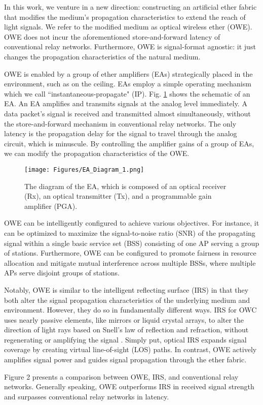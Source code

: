 In this work, we venture in a new direction: constructing an artificial ether fabric that modifies the medium's propagation characteristics to extend the reach of light signals. We refer to the modified medium as optical wireless ether (OWE). OWE does not incur the aforementioned store-and-forward latency of conventional relay networks. Furthermore, OWE is signal-format agnostic: it just changes the propagation characteristics of the natural medium.
\par
OWE is enabled by a group of ether amplifiers (EAs) strategically placed in the environment, such as on the ceiling. EAs employ a simple operating mechanism which we call “instantaneous-propagate" (IP). 
Fig. \ref{EA_Diagram} shows the schematic of an EA. An EA amplifies and transmits signals at the analog level immediately. A data packet's signal is received and transmitted almost simultaneously, without the store-and-forward mechanism in conventional relay networks. The only latency is the propagation delay for the signal to travel through the analog circuit, which is minuscule. By controlling the amplifier gains of a group of EAs, we can modify the propagation characteristics of the OWE.
\begin{figure}
\centering
\texttt{[image: Figures/EA\_Diagram\_1.png]}
\caption{The diagram of the EA, which is composed of an optical receiver (Rx), an optical transmitter (Tx), and a programmable gain amplifier (PGA).}
\label{EA_Diagram}
\vspace{-0.2cm}
\end{figure}
\par
OWE can be intelligently configured to achieve various objectives. For instance, it can be optimized to maximize the signal-to-noise ratio (SNR) of the propagating signal within a single basic service set (BSS) \cite{gast2005802} consisting of one AP serving a group of stations. Furthermore, OWE can be configured to promote fairness in resource allocation and mitigate mutual interference across multiple BSSs, where multiple APs serve disjoint groups of stations.
\par
Notably, OWE is similar to the intelligent reflecting surface (IRS) in that they both alter the signal propagation characteristics of the underlying medium and environment. However, they do so in fundamentally different ways. IRS for OWC uses nearly passive elements, like mirrors or liquid crystal arrays, to alter the direction of light rays based on Snell’s law of reflection and refraction, without regenerating or amplifying the signal \cite{maraqa2023optimized, aboagye2022design, aboagye2022ris, 9326394, 9443170, 9276478}. Simply put, optical IRS expands signal coverage by creating virtual line-of-sight (LOS) paths. In contrast, OWE actively amplifies signal power and guides signal propagation through the ether fabric.
\par
Figure 2 presents a comparison between OWE, IRS, and conventional relay networks. Generally speaking, OWE outperforms IRS in received signal strength and surpasses conventional relay networks in latency.

